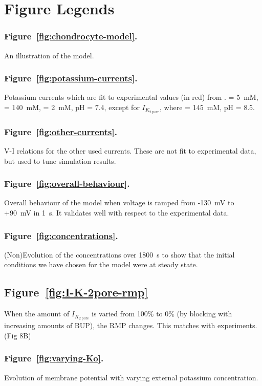 \section*{Figure Legends}
\label{figures}

\subsubsection*{Figure~\ref{fig:chondrocyte-model}.}
An illustration of the model.


\subsubsection*{Figure~\ref{fig:potassium-currents}.}
Potassium currents which are fit to experimental values (in red) from
\cite{Clarketal2011}. \Ko = 5~mM, \Nao = 140~mM, \Cao = 2~mM, pH = 7.4,
except for $I_{K_{\mathrm{2\; pore}}}$, where \Ko = 145~mM, pH = 8.5.

\subsubsection*{Figure~\ref{fig:other-currents}.}
V-I relations for the other used currents. These are not fit to
experimental data, but used to tune simulation results.

\subsubsection*{Figure~\ref{fig:overall-behaviour}.}
Overall behaviour of the model when voltage is ramped from -130~mV to
+90~mV in 1~s. It validates well with respect to the experimental data.

\subsubsection*{Figure~\ref{fig:concentrations}.}
(Non)Evolution of the concentrations over 1800~s to show that the
initial conditions we have chosen for the model were at steady state.

\subsection*{Figure~\ref{fig:I-K-2pore-rmp}}
When the amount of $I_{K_{\mathrm{2\; pore}}}$ is varied from 100\% to
0\% (by blocking with increasing amounts of BUP), the RMP
changes. This matches with experiments. (Fig 8B)

\subsubsection*{Figure~\ref{fig:varying-Ko}.}
Evolution of membrane potential with varying external potassium
concentration.

